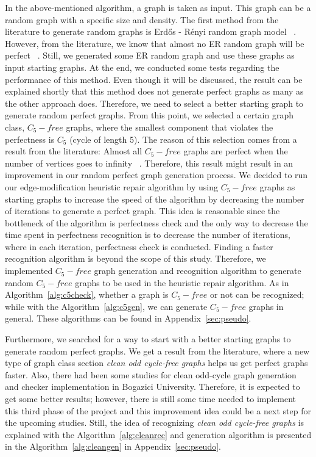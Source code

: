 In the above-mentioned algorithm, a graph is taken as input. This graph can be a random graph with a specific size and density. The first method from the literature to generate random graphs is Erdős - Rényi random graph model ~\cite{erdos}. However, from the literature, we know that almost no ER random graph will be perfect ~\cite{erdos}. Still, we generated some ER random graph and use these graphs as input starting graphs. At the end, we conducted some tests regarding the performance of this method. Even though it will be discussed, the result can be explained shortly that this method does not generate perfect graphs as many as the other approach does. Therefore, we need to select a better starting graph to generate random perfect graphs. From this point, we selected a certain graph class, ${C_5-free}$ graphs, where the smallest component that violates the perfectness is ${C_5}$ (cycle of length 5). The reason of this selection comes from a result from the literature: Almost all ${C_5-free}$ graphs are perfect when the number of vertices goes to infinity ~\cite{promel}. Therefore, this result might result in an improvement in our random perfect graph generation process. We decided to run our edge-modification heuristic repair algorithm by using ${C_5-free}$ graphs as starting graphs to increase the speed of the algorithm by decreasing the number of iterations to generate a perfect graph. This idea is reasonable since the bottleneck of the algorithm is perfectness check and the only way to decrease the time spent in perfectness recognition is to decrease the number of iterations, where in each iteration, perfectness check is conducted. Finding a faster recognition algorithm is beyond the scope of this study. Therefore, we implemented ${C_5-free}$ graph generation and recognition algorithm to generate random ${C_5-free}$ graphs to be used in the heuristic repair algorithm. As in Algorithm~\ref{alg:c5check}, whether a graph is ${C_5-free}$ or not can be recognized; while with the Algorithm~\ref{alg:c5gen}, we can generate ${C_5-free}$ graphs in general. These algorithms can be found in Appendix~\ref{sec:pseudo}.


Furthermore, we searched for a way to start with a better starting graphs to generate random perfect graphs. We get a result from the literature, where a new type of graph class section \textit{clean odd cycle-free graphs} helps us get perfect graphs faster. Also, there had been some studies for clean odd-cycle graph generation and checker implementation in Bogazici University. Therefore, it is expected to get some better results; however, there is still some time needed to implement this third phase of the project and this improvement idea could be a next step for the upcoming studies. Still, the idea of recognizing \textit{clean odd cycle-free graphs} is explained with the Algorithm~\ref{alg:cleanrec} and generation algorithm is presented in the Algorithm~\ref{alg:cleangen} in Appendix~\ref{sec:pseudo}.

